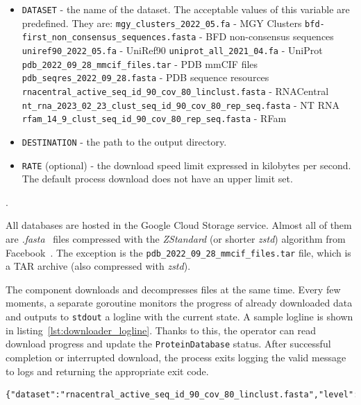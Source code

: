 \begin{itemize}
    \item \texttt{DATASET} - the name of the dataset.
    The acceptable values of this variable are predefined.
    They are:
    \subitem \texttt{mgy\_clusters\_2022\_05.fa} - MGY Clusters
    \subitem \texttt{bfd-first\_non\_consensus\_sequences.fasta} - BFD non-consensus sequences
    \subitem \texttt{uniref90\_2022\_05.fa} - UniRef90
    \subitem \texttt{uniprot\_all\_2021\_04.fa} - UniProt
    \subitem \texttt{pdb\_2022\_09\_28\_mmcif\_files.tar} - PDB mmCIF files
    \subitem \texttt{pdb\_seqres\_2022\_09\_28.fasta} - PDB sequence resources
    \subitem \texttt{rnacentral\_active\_seq\_id\_90\_cov\_80\_linclust.fasta} - RNACentral
    \subitem \texttt{nt\_rna\_2023\_02\_23\_clust\_seq\_id\_90\_cov\_80\_rep\_seq.fasta} - NT RNA
    \subitem \texttt{rfam\_14\_9\_clust\_seq\_id\_90\_cov\_80\_rep\_seq.fasta} - RFam
    \item \texttt{DESTINATION} - the path to the output directory.
    \item \texttt{RATE} (optional) - the download speed limit expressed in kilobytes per second.
    The default process download does not have an upper limit set.
\end{itemize}.

All databases are hosted in the Google Cloud Storage service.
Almost all of them are \textit{.fasta}~\cite{pearson1988fasta} files compressed with the \textit{ZStandard} (or shorter \textit{zstd}) algorithm from Facebook~\cite{zstandard}.
The exception is the \texttt{pdb\_2022\_09\_28\_mmcif\_files.tar} file, which is a TAR archive (also compressed with \textit{zstd}).

The component downloads and decompresses files at the same time.
Every few moments, a separate goroutine monitors the progress of already downloaded data and outputs to \texttt{stdout} a logline with the current state.
A sample logline is shown in listing~\ref{lst:downloader_logline}.
Thanks to this, the operator can read download progress and update the \texttt{ProteinDatabase} status.
After successful completion or interrupted download, the process exits logging the valid message to logs and returning the appropriate exit code.

\begin{lstlisting}[language=txt,caption={Sample logline from downloader},label={lst:downloader_logline}]
{"dataset":"rnacentral_active_seq_id_90_cov_80_linclust.fasta","level":"info","msg":"Download progress","size":7700349721,"time":"2025-05-17T16:53:52+02:00","total":13860314914,"type":"download","unit":"bytes"}
\end{lstlisting}

